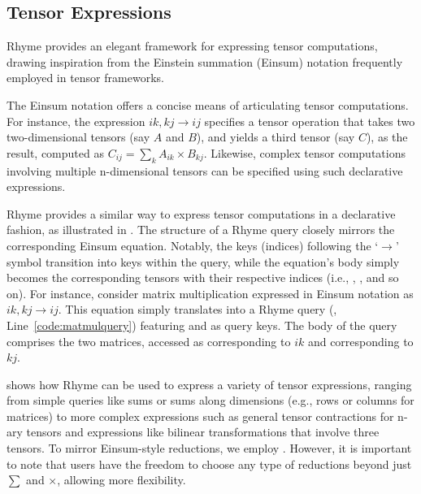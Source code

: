 \documentclass[runningheads]{llncs}
\newcommand{\lang}{Rhyme}
\begin{document}
\subsection{Tensor Expressions}\label{subsec:tensor}

\lang{} provides an elegant framework for expressing tensor computations,
drawing inspiration from the Einstein summation (Einsum) notation frequently
employed in tensor frameworks.

The Einsum notation offers a concise means of articulating tensor computations.
For instance, the expression $ik,kj \rightarrow ij$ specifies a tensor operation
that takes two two-dimensional tensors (say $A$ and $B$), and yields a third
tensor (say $C$), as the result, computed as $C_{ij} = \sum_k A_{ik} \times B_{kj}$.
Likewise, complex tensor computations involving multiple n-dimensional tensors can
be specified using such declarative expressions.

\lang{} provides a similar way to express tensor computations in a declarative fashion,
as illustrated in .
The structure of a \lang{} query closely mirrors the corresponding Einsum equation.
Notably, the keys (indices) following the `$\rightarrow$' symbol transition into keys
within the query, while the equation's body simply becomes the corresponding tensors
with their respective indices (i.e., , , and so on).
For instance, consider matrix multiplication expressed in Einsum notation as
$ik,kj \rightarrow ij$.
This equation simply translates into a \lang{} query (, Line~\ref{code:matmulquery}) featuring  and
 as query keys. The body of the query comprises the two matrices, accessed as
 corresponding to $ik$ and  corresponding to $kj$.

 shows how \lang{} can be used to express a variety of
tensor expressions, ranging from simple queries like sums or sums along
dimensions (e.g., rows or columns for matrices) to more complex expressions
such as general tensor contractions for n-ary tensors and expressions like
bilinear transformations that involve three tensors. 
To mirror Einsum-style reductions, we employ .
However, it is important to note that users have the freedom to choose
any type of reductions beyond just $\sum$ and $\times$, allowing more flexibility.
\end{document}
